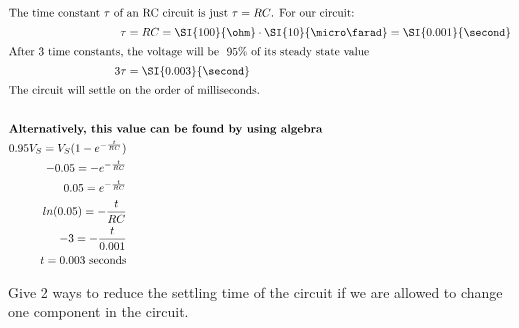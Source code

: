 \begin{enumerate}
{\begin{align*}
\intertext{The time constant $\tau$ of an RC circuit is just $\tau = RC$. For our circuit:}
\tau &= RC = \SI{100}{\ohm} \cdot \SI{10}{\micro\farad} = \SI{0.001}{\second} \\
\intertext{After 3 time constants, the voltage will be ~95\% of its steady state value}
3\tau &= \SI{0.003}{\second} \\
\intertext{The circuit will settle on the order of milliseconds.} \\
\intertext{\textbf{Alternatively, this value can be found by using algebra}}
0.95V_S = V_S(1 - e^{-\frac{t}{RC}}) \\
-0.05 = -e^{-\frac{t}{RC}} \\
0.05 = e^{-\frac{t}{RC}} \\
ln(0.05) = -\frac{t}{RC} \\
-3 = -\frac{t}{0.001} \\
t = 0.003 \text{ seconds}
\end{align*}

}

\qitem Give 2 ways to reduce the settling time of the circuit if we are allowed to change one component in the circuit.



\end{enumerate}
